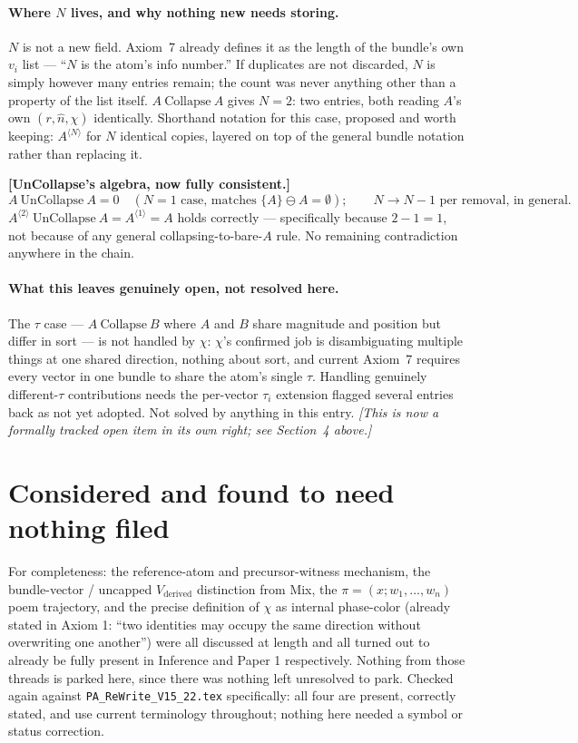 \documentclass[11pt]{article}
\begin{document}
\paragraph{Where $N$ lives, and why nothing new needs storing.} $N$
is not a new field. Axiom~7 already defines it as the length of the
bundle's own $v_i$ list --- ``$N$ is the atom's info number.'' If
duplicates are not discarded, $N$ is simply however many entries
remain; the count was never anything other than a property of the
list itself. $A\ \text{Collapse}\ A$ gives $N=2$: two entries, both
reading $A$'s own $(r,\hat n,\chi)$ identically. Shorthand notation
for this case, proposed and worth keeping: $A^{\langle N\rangle}$ for
$N$ identical copies, layered on top of the general bundle notation
rather than replacing it.

\textbf{[UnCollapse's algebra, now fully consistent.]}
\[
A\ \text{UnCollapse}\ A = 0 \quad (N=1\text{ case, matches }\{A\}\ominus A=\emptyset);
\qquad N \to N-1 \text{ per removal, in general.}
\]
$A^{\langle 2\rangle}\ \text{UnCollapse}\ A = A^{\langle 1\rangle} = A$
holds correctly --- specifically because $2-1=1$, not because of any
general collapsing-to-bare-$A$ rule. No remaining contradiction
anywhere in the chain.

\paragraph{What this leaves genuinely open, not resolved here.} The
$\tau$ case --- $A\ \text{Collapse}\ B$ where $A$ and $B$ share
magnitude and position but differ in sort --- is not handled by
$\chi$: $\chi$'s confirmed job is disambiguating multiple things at
one shared direction, nothing about sort, and current Axiom~7
requires every vector in one bundle to share the atom's single
$\tau$. Handling genuinely different-$\tau$ contributions needs the
per-vector $\tau_i$ extension flagged several entries back as not yet
adopted. Not solved by anything in this entry. \emph{[This is now a
formally tracked open item in its own right; see Section~4 above.]}

\section{Considered and found to need nothing filed}

For completeness: the reference-atom and precursor-witness mechanism,
the bundle-vector / uncapped $V_{\text{derived}}$ distinction from
Mix, the $\pi=(x;w_1,\ldots,w_n)$ poem trajectory, and the precise
definition of $\chi$ as internal phase-color (already stated in
Axiom 1: ``two identities may occupy the same direction without
overwriting one another'') were all discussed at length and all
turned out to already be fully present in Inference and Paper 1
respectively. Nothing from those threads is parked here, since there
was nothing left unresolved to park. Checked again against
\texttt{PA\_ReWrite\_V15\_22.tex} specifically: all four are present,
correctly stated, and use current terminology throughout; nothing
here needed a symbol or status correction.
\end{document}
